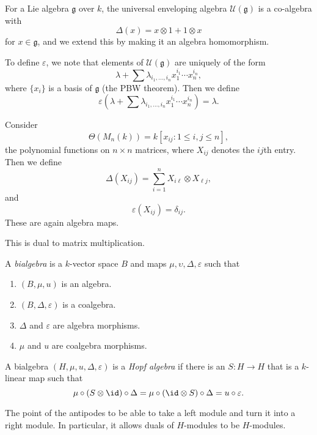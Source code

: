\documentclass[a4paper]{article}
\begin{document}
\begin{eg}
  For a Lie algebra $\mathfrak{g}$ over $k$, the universal enveloping algebra $\mathcal{U}(\mathfrak{g})$ is a co-algebra with
  \[
    \Delta(x) = x \otimes 1 + 1 \otimes x
  \]
  for $x \in \mathfrak{g}$, and we extend this by making it an algebra homomorphism. %

  To define $\varepsilon$, we note that elements of $\mathcal{U}(\mathfrak{g})$ are uniquely of the form
  \[
    \lambda + \sum \lambda_{i_1, \ldots, i_n} x_1^{i_1} \cdots x_n^{i_n},
  \]
  where $\{x_i\}$ is a basis of $\mathfrak{g}$ (the PBW theorem). Then we define
  \[
    \varepsilon\left(\lambda + \sum \lambda_{i_1, \ldots, i_n} x_1^{i_1} \cdots x_n^{i_n}\right) = \lambda.
  \]
\end{eg}

\begin{eg}
  Consider
  \[
    \Theta(M_n(k)) = k[x_{ij}: 1 \leq i, j\leq n],
  \]
  the polynomial functions on $n \times n$ matrices, where $X_{ij}$ denotes the $ij$th entry. Then we define
  \[
    \Delta (X_{ij}) = \sum_{i = 1}^n X_{i\ell} \otimes X_{\ell j},
  \]
  and
  \[
    \varepsilon(X_{ij}) = \delta_{ij}.
  \]
  These are again algebra maps.
\end{eg}
This is dual to matrix multiplication.

\begin{defi}[Bialgebra]
  A \emph{bialgebra} is a $k$-vector space $B$ and maps $\mu, \upsilon, \Delta, \varepsilon$ such that
  \begin{enumerate}
    \item $(B, \mu, u)$ is an algebra.
    \item $(B, \Delta, \varepsilon)$ is a coalgebra.
    \item $\Delta$ and $\varepsilon$ are algebra morphisms.
    \item $\mu$ and $u$ are coalgebra morphisms.
  \end{enumerate}
\end{defi}

\begin{defi}
  A bialgebra $(H, \mu, u, \Delta, \varepsilon)$ is a \emph{Hopf algebra} if there is an  $S: H \to H$ that is a $k$-linear map such that
  \[
    \mu \circ (S \otimes \id) \circ \Delta = \mu \circ (\id \otimes S) \circ \Delta = u \circ \varepsilon.
  \]
\end{defi}
The point of the antipodes to be able to take a left module and turn it into a right module. In particular, it allows duals of $H$-modules to be $H$-modules.
\end{document}
